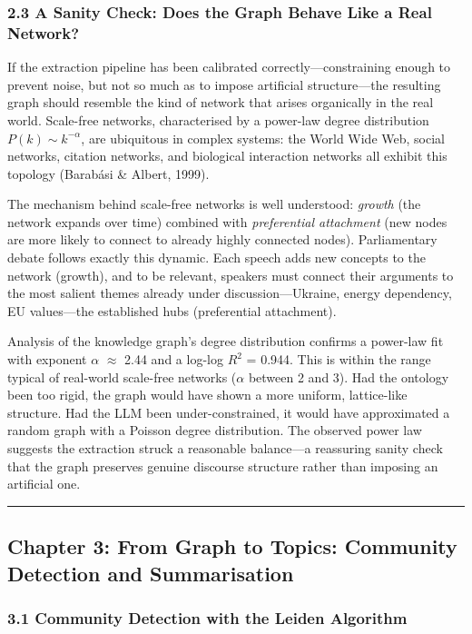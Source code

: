 \documentclass[11pt]{article}
\begin{document}
\subsubsection{2.3 A Sanity Check: Does the Graph Behave Like a Real Network?}


If the extraction pipeline has been calibrated correctly---constraining enough to prevent noise, but not so much as to impose artificial structure---the resulting graph should resemble the kind of network that arises organically in the real world. Scale-free networks, characterised by a power-law degree distribution $P(k) \sim k^{-\alpha}$, are ubiquitous in complex systems: the World Wide Web, social networks, citation networks, and biological interaction networks all exhibit this topology (Barab\'{a}si \& Albert, 1999).

The mechanism behind scale-free networks is well understood: \emph{growth} (the network expands over time) combined with \emph{preferential attachment} (new nodes are more likely to connect to already highly connected nodes). Parliamentary debate follows exactly this dynamic. Each speech adds new concepts to the network (growth), and to be relevant, speakers must connect their arguments to the most salient themes already under discussion---Ukraine, energy dependency, EU values---the established hubs (preferential attachment).

Analysis of the knowledge graph's degree distribution confirms a power-law fit with exponent $\alpha$ $\approx$ 2.44 and a log-log $R^2$ = 0.944. This is within the range typical of real-world scale-free networks ($\alpha$ between 2 and 3). Had the ontology been too rigid, the graph would have shown a more uniform, lattice-like structure. Had the LLM been under-constrained, it would have approximated a random graph with a Poisson degree distribution. The observed power law suggests the extraction struck a reasonable balance---a reassuring sanity check that the graph preserves genuine discourse structure rather than imposing an artificial one.


\hrule


\subsection{Chapter 3: From Graph to Topics: Community Detection and Summarisation}


\subsubsection{3.1 Community Detection with the Leiden Algorithm}
\end{document}
